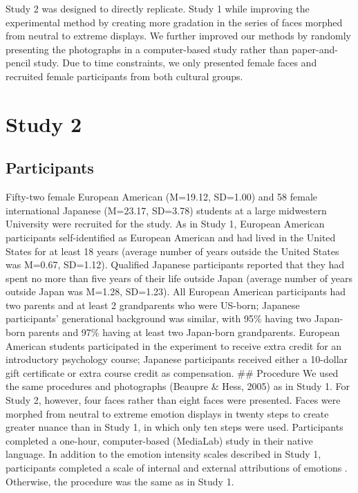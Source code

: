 \documentclass[english,man]{apa6}
\begin{document}
Study 2 was designed to directly replicate. Study 1 while improving the
experimental method by creating more gradation in the series of faces
morphed from neutral to extreme displays. We further improved our
methods by randomly presenting the photographs in a computer-based study
rather than paper-and-pencil study. Due to time constraints, we only
presented female faces and recruited female participants from both
cultural groups.

\section{Study 2}\label{study-2}

\subsection{Participants}\label{participants-1}

Fifty-two female European American (M=19.12, SD=1.00) and 58 female
international Japanese (M=23.17, SD=3.78) students at a large midwestern
University were recruited for the study. As in Study 1, European
American participants self-identified as European American and had lived
in the United States for at least 18 years (average number of years
outside the United States was M=0.67, SD=1.12). Qualified Japanese
participants reported that they had spent no more than five years of
their life outside Japan (average number of years outside Japan was
M=1.28, SD=1.23). All European American participants had two parents and
at least 2 grandparents who were US-born; Japanese participants'
generational background was similar, with 95\% having two Japan-born
parents and 97\% having at least two Japan-born grandparents. European
American students participated in the experiment to receive extra credit
for an introductory psychology course; Japanese participants received
either a 10-dollar gift certificate or extra course credit as
compensation. \#\# Procedure We used the same procedures and photographs
(Beaupre \& Hess, 2005) as in Study 1. For Study 2, however, four faces
rather than eight faces were presented. Faces were morphed from neutral
to extreme emotion displays in twenty steps to create greater nuance
than in Study 1, in which only ten steps were used. Participants
completed a one-hour, computer-based (MediaLab) study in their native
language. In addition to the emotion intensity scales described in Study
1, participants completed a scale of internal and external attributions
of emotions . Otherwise, the procedure was the same as in Study 1.
\end{document}

